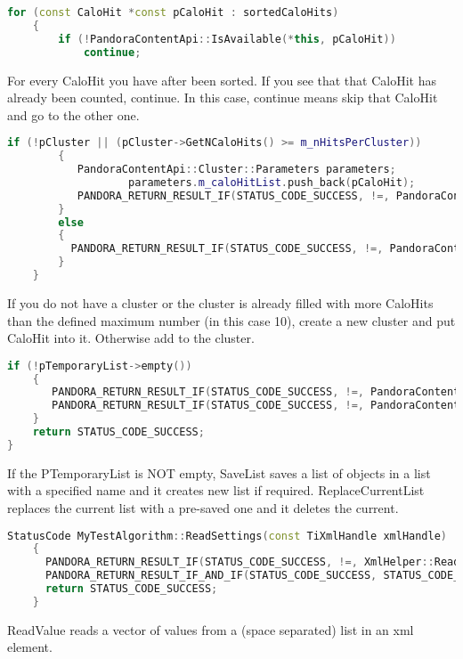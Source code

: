\begin{lstlisting}[language=C++]
	for (const CaloHit *const pCaloHit : sortedCaloHits)
	{
		if (!PandoraContentApi::IsAvailable(*this, pCaloHit))
		    continue;
\end{lstlisting}
For every CaloHit you have after been sorted. If you see that that CaloHit has already been counted, continue. In this case, continue means skip that CaloHit and go to the other one.
\begin{lstlisting}[language=C++]
		if (!pCluster || (pCluster->GetNCaloHits() >= m_nHitsPerCluster))
		{
		   PandoraContentApi::Cluster::Parameters parameters;
                   parameters.m_caloHitList.push_back(pCaloHit);
		   PANDORA_RETURN_RESULT_IF(STATUS_CODE_SUCCESS, !=, PandoraContentApi::Cluster::Create(*this, parameters, pCluster));
		}
  		else
 		{
		  PANDORA_RETURN_RESULT_IF(STATUS_CODE_SUCCESS, !=, PandoraContentApi::AddToCluster(*this, pCluster, pCaloHit));
		}
	}
\end{lstlisting}
If you do not have a cluster or the cluster is already filled with more CaloHits than the defined maximum number (in this case 10), create a new cluster and put CaloHit into it. Otherwise add to the cluster.
\begin{lstlisting}[language=C++]
	if (!pTemporaryList->empty())
	{
	   PANDORA_RETURN_RESULT_IF(STATUS_CODE_SUCCESS, !=, PandoraContentApi::SaveList<Cluster>(*this, m_outputClusterListName));
	   PANDORA_RETURN_RESULT_IF(STATUS_CODE_SUCCESS, !=, PandoraContentApi::ReplaceCurrentList<Cluster>(*this, m_outputClusterListName));
	}
	return STATUS_CODE_SUCCESS;
}
\end{lstlisting}
If the PTemporaryList is NOT empty, SaveList saves a list of objects in a list with a specified name and it creates new list if required. ReplaceCurrentList replaces the current list with a pre-saved one and it deletes the current.

\begin{lstlisting}[language=C++]
StatusCode MyTestAlgorithm::ReadSettings(const TiXmlHandle xmlHandle)
	{
	  PANDORA_RETURN_RESULT_IF(STATUS_CODE_SUCCESS, !=, XmlHelper::ReadValue(xmlHandle, "OutputClusterListName", m_outputClusterListName));
	  PANDORA_RETURN_RESULT_IF_AND_IF(STATUS_CODE_SUCCESS, STATUS_CODE_NOT_FOUND, !=, XmlHelper::ReadValue(xmlHandle,"NHitsPerCluster", m_nHitsPerCluster));
	  return STATUS_CODE_SUCCESS;
	}
\end{lstlisting}

ReadValue reads a vector of values from a (space separated) list in an xml element.

\begin{lstlisting}[language=C++]
\end{lstlisting}

